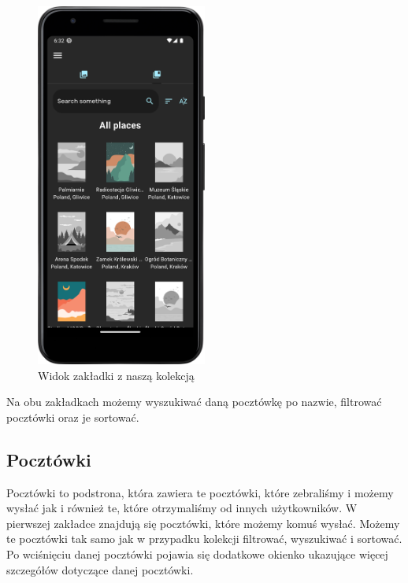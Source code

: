 \documentclass[a4paper,twoside,12pt]{book}
\begin{document}
\begin{figure}[H]
    \centering
    \includegraphics[width=0.5\textwidth]{mobile_ss/obrazki_wszystkie.png}
    \caption{Widok zakładki z naszą kolekcją}
\end{figure}

Na obu zakładkach możemy wyszukiwać daną pocztówkę po nazwie, filtrować pocztówki oraz je sortować. 

\subsection{Pocztówki}
Pocztówki to podstrona, która zawiera te pocztówki, które zebraliśmy i możemy wysłać jak i również te, które otrzymaliśmy od innych użytkowników. W pierwszej zakładce znajdują się pocztówki, które możemy komuś wysłać. Możemy te pocztówki tak samo jak w przypadku kolekcji filtrować, wyszukiwać i sortować. Po wciśnięciu danej pocztówki pojawia się dodatkowe okienko ukazujące więcej szczegółów dotyczące danej pocztówki. 
\end{document}
